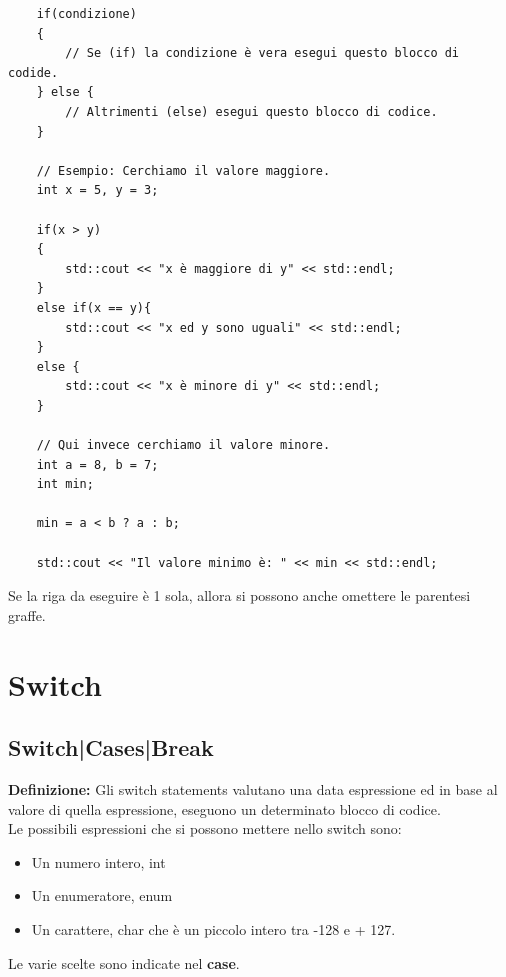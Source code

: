 \begin{lstlisting}
	if(condizione)
	{
		// Se (if) la condizione è vera esegui questo blocco di codide.
	} else {
		// Altrimenti (else) esegui questo blocco di codice.
	}

	// Esempio: Cerchiamo il valore maggiore.
	int x = 5, y = 3;
	
	if(x > y)
	{
		std::cout << "x è maggiore di y" << std::endl;
	} 
	else if(x == y){
		std::cout << "x ed y sono uguali" << std::endl;
	}
	else {
		std::cout << "x è minore di y" << std::endl;
	}

	// Qui invece cerchiamo il valore minore.
	int a = 8, b = 7;
	int min;
	
	min = a < b ? a : b;
	
	std::cout << "Il valore minimo è: " << min << std::endl;
\end{lstlisting}

\textsf{\small Se la riga da eseguire è 1 sola, allora si possono anche omettere le parentesi graffe.} \\


\section{Switch}

\subsection{Switch|Cases|Break}

\textsf{\small \textbf{Definizione: } Gli switch statements valutano una data espressione ed in base al valore di quella espressione, eseguono un determinato blocco di codice.} \\

\textsf{\small Le possibili espressioni che si possono mettere nello switch sono: }

\begin{itemize}
	\item \textsf{\small Un numero intero, \color{myblue2}int}
	\item \textsf{\small Un enumeratore, \color{myblue2}enum}
	\item \textsf{\small Un carattere, \color{myblue2}char \normalcolor che è un piccolo intero tra -128 e + 127.}
\end{itemize}

\textsf{\small Le varie scelte sono indicate nel \textbf{case}.} \\

